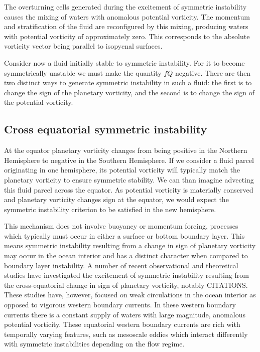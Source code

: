 The overturning cells generated during the excitement of symmetric instability causes the mixing of waters with anomalous potential vorticity. The momentum and stratification of the fluid are reconfigured by this mixing, producing waters with potential  vorticity of approximately zero. This corresponds to the absolute vorticity vector being parallel to isopycnal surfaces.

Consider now a fluid initially stable to symmetric instability. For it to become symmetrically unstable we must make the quantity $fQ$ negative. There are then two distinct ways to generate symmetric instability in such a fluid: the first is to change the sign of the planetary vorticity, and the second is to change the sign of the potential vorticity.

\subsection{Cross equatorial symmetric instability}
At the equator planetary vorticity changes from being positive in the Northern Hemisphere to negative in the Southern Hemisphere. If we consider a fluid parcel originating in one hemisphere, its potential vorticity will typically match the planetary vorticity to ensure symmetric stability. We can than imagine advecting this fluid parcel across the equator. As potential vorticity is materially conserved and planetary vorticity changes sign at the equator, we would expect the symmetric instability criterion to be satisfied in the new hemisphere.

This mechanism does not involve buoyancy or momentum forcing, processes which typically must occur in either a surface or bottom boundary layer. This means symmetric instability resulting from a change in sign of planetary vorticity may occur in the ocean interior and has a distinct character when compared to boundary layer instability. A number of recent observational and theoretical studies have investigated the excitement of symmetric instability resulting from the cross-equatorial change in sign of planetary vorticity, notably CITATIONS. These studies have, however, focused on weak circulations in the ocean interior as opposed to vigorous western boundary currents. In these western boundary currents there is a constant supply of waters with large magnitude, anomalous potential vorticity. These equatorial western boundary currents are rich with temporally varying features, such as mesoscale eddies which interact differently with symmetric instabilities depending on the flow regime.

